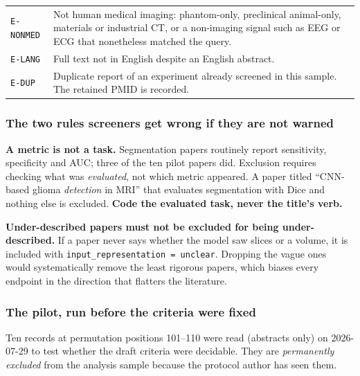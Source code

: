 \documentclass[11pt,a4paper]{article}
\begin{document}
\begin{table}[htbp]
\begin{tabular}{@{}lL{11.4cm}@{}}
\texttt{E-NONMED} & Not human medical imaging: phantom-only, preclinical animal-only, materials or industrial CT, or a non-imaging signal such as EEG or ECG that nonetheless matched the query. \\
\texttt{E-LANG}   & Full text not in English despite an English abstract. \\
\texttt{E-DUP}    & Duplicate report of an experiment already screened in this sample. The retained PMID is recorded. \\
\bottomrule
\end{tabular}
\end{table}

\subsubsection*{The two rules screeners get wrong if they are not warned}

\textbf{A metric is not a task.} Segmentation papers routinely report sensitivity,
specificity and AUC; three of the ten pilot papers did. Exclusion requires checking
what was \emph{evaluated}, not which metric appeared. A paper titled ``CNN-based
glioma \emph{detection} in MRI'' that evaluates segmentation with Dice and nothing
else is excluded. \textbf{Code the evaluated task, never the title's verb.}

\textbf{Under-described papers must not be excluded for being under-described.} If a
paper never says whether the model saw slices or a volume, it is included with
\texttt{input\_representation = unclear}. Dropping the vague ones would
systematically remove the least rigorous papers, which biases every endpoint in the
direction that flatters the literature.

\subsubsection*{The pilot, run before the criteria were fixed}

Ten records at permutation positions 101--110 were read (abstracts only) on
2026-07-29 to test whether the draft criteria were decidable. They are
\emph{permanently excluded} from the analysis sample because the protocol author has
seen them.
\end{document}
